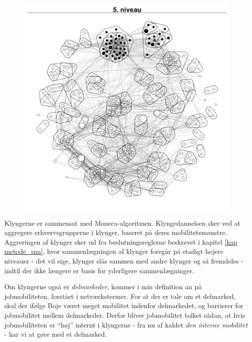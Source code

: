 
\begin{figure}[H]
\begin{centering}
  \includegraphics[width=10 cm]{fig/netvaerkskort/kort_seg_proces5.pdf}
  \caption{}
  \label{fig_seg_proces5}
\end{centering}
\end{figure}

Klyngerne er sammensat med Moneca-algoritmen. Klyngedannelsen sker ved at aggregere erhvervsgrupperne i klynger, baseret på deres mobilitetsmønstre. Aggreringen af klynger sker ud fra beslutningsreglerne beskrevet i kapitel \ref{kap metode_sna}, hvor sammenlægningen af klynger foregår på stadigt højere niveauer - det vil sige, klynger slås sammen med andre klynger og så fremdeles - indtil der ikke længere er basis for yderligere sammenlægninger. 

Om klyngerne også er \emph{delmarkeder}, kommer i min definition an på jobmobiliteten, forstået i netværkstermer. For at der er tale om et delmarked, skal der ifølge Boje været meget mobilitet indenfor delmarkedet, og barrierer for jobmobilitet mellem  delmarkeder. Derfor bliver jobmobilitet tolket sådan, at hvis jobmobiliteten er “høj” internt i klyngerne - fra nu af kaldet \emph{den interne mobilitet} - har vi at gøre med et delmarked. 

